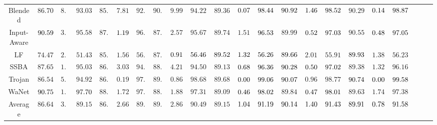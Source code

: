 \begin{table*}[h]
{\begin{tabular}{c|ccc|ccc|ccc|ccc|ccc|ccc|ccc}
Blended \cite{chen2017targeted} & $86.70$& $8.23$& $93.03$& $85.96$& $7.81$& $92.87$& $90.85$& $9.99$& $94.22$& $89.36$& $\cellcolor[HTML]{F1B9B6}0.07$& $\cellcolor[HTML]{D7E8F2}98.44$& $\cellcolor[HTML]{D7E8F2}90.92$& $\cellcolor[HTML]{D7E8F2}1.46$& $\cellcolor[HTML]{FEEBB8}98.52$& $90.29$& $\cellcolor[HTML]{FEEBB8}0.14$& $\cellcolor[HTML]{F1B9B6}98.87$\\
Input-Aware \cite{nguyen2020input} & $\cellcolor[HTML]{D7E8F2}90.59$& $3.41$& $95.58$& $87.33$& $\cellcolor[HTML]{D7E8F2}1.19$& $96.03$& $87.99$& $2.57$& $95.67$& $89.74$& $1.51$& $\cellcolor[HTML]{D7E8F2}96.53$& $89.99$& $\cellcolor[HTML]{FEEBB8}0.52$& $\cellcolor[HTML]{FEEBB8}97.03$& $90.55$& $\cellcolor[HTML]{F1B9B6}0.48$& $\cellcolor[HTML]{F1B9B6}97.05$\\
LF \cite{zeng2021rethinking} & $74.47$& $2.17$& $51.43$& $85.64$& $1.56$& $56.14$& $87.64$& $\cellcolor[HTML]{F1B9B6}0.91$& $\cellcolor[HTML]{F1B9B6}56.46$& $\cellcolor[HTML]{D7E8F2}89.52$& $\cellcolor[HTML]{D7E8F2}1.32$& $\cellcolor[HTML]{D7E8F2}56.26$& $\cellcolor[HTML]{FEEBB8}89.66$& $2.01$& $55.91$& $\cellcolor[HTML]{F1B9B6}89.93$& $1.38$& $56.23$\\
SSBA \cite{li2021invisible} & $87.65$& $1.84$& $95.03$& $86.86$& $3.03$& $94.04$& $88.94$& $4.21$& $94.50$& $89.13$& $\cellcolor[HTML]{FEEBB8}0.68$& $\cellcolor[HTML]{D7E8F2}96.36$& $\cellcolor[HTML]{F1B9B6}90.28$& $\cellcolor[HTML]{F1B9B6}0.50$& $\cellcolor[HTML]{F1B9B6}97.02$& $89.38$& $1.32$& $96.16$\\
Trojan \cite{Trojannn} & $86.54$& $5.13$& $94.92$& $86.33$& $0.19$& $97.29$& $89.79$& $0.86$& $98.68$& $89.68$& $\cellcolor[HTML]{FEEBB8}0.00$& $\cellcolor[HTML]{FEEBB8}99.06$& $\cellcolor[HTML]{FEEBB8}90.07$& $0.96$& $98.77$& $\cellcolor[HTML]{F1B9B6}90.74$& $\cellcolor[HTML]{F1B9B6}0.00$& $\cellcolor[HTML]{F1B9B6}99.58$\\
WaNet \cite{nguyen2021wanet} & $\cellcolor[HTML]{FEEBB8}90.75$& $1.10$& $\cellcolor[HTML]{D7E8F2}97.70$& $88.24$& $1.72$& $97.38$& $88.25$& $1.88$& $97.31$& $89.09$& $\cellcolor[HTML]{FEEBB8}0.46$& $\cellcolor[HTML]{F1B9B6}98.02$& $89.84$& $\cellcolor[HTML]{D7E8F2}0.47$& $\cellcolor[HTML]{FEEBB8}98.01$& $89.63$& $1.74$& $97.38$\\ \midrule
Average & $86.64$& $3.06$& $89.15$& $86.63$& $2.66$& $89.48$& $89.10$& $2.86$& $90.49$& $89.15$& $\cellcolor[HTML]{FEEBB8}1.04$& $\cellcolor[HTML]{D7E8F2}91.19$& $\cellcolor[HTML]{F1B9B6}90.14$& $\cellcolor[HTML]{D7E8F2}1.40$& $\cellcolor[HTML]{FEEBB8}91.43$& $\cellcolor[HTML]{FEEBB8}89.91$& $\cellcolor[HTML]{F1B9B6}0.78$& $\cellcolor[HTML]{F1B9B6}91.58$\\
\bottomrule
\end{tabular}}
\end{table*}
